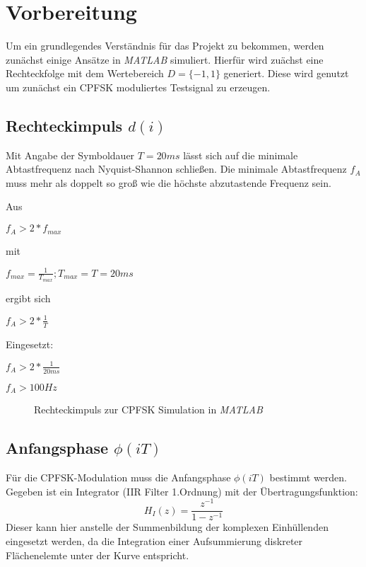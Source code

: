 \documentclass{article}
\begin{document}
\section{Vorbereitung}
Um ein grundlegendes Verständnis für das Projekt zu bekommen, werden zunächst einige Ansätze in \textit{MATLAB} simuliert.
Hierfür wird zuächst eine Rechteckfolge mit dem Wertebereich $D = \{-1,1\}$ generiert. Diese wird genutzt um zunächst ein 
\ac{CPFSK} moduliertes Testsignal zu erzeugen.

\subsection{Rechteckimpuls $d(i)$}\label{sec:rechteck}
Mit Angabe der Symboldauer $T = 20ms$ lässt sich auf die minimale Abtastfrequenz nach Nyquist-Shannon schließen.
Die minimale Abtastfrequenz $f_A$ muss mehr als doppelt so groß wie die höchste abzutastende Frequenz sein.

Aus
\begin{center}
 $
f_A > 2*f_{max}
$
\end{center}

mit 
\begin{center} $f_{max} = \frac{1}{T_{max}} ; T_{max} = T = 20ms$  \end{center}

ergibt sich

\begin{center}
$
f_A > 2*\frac{1}{T}
$
\end{center}

Eingesetzt:
\begin{center}
$f_A > 2*\frac{1}{20ms}$
\end{center}
\begin{center}
$f_A > 100Hz$   
\end{center}
\begin{figure}[!h]
    \centering
    \def\svgscale{0.3}
    \def\svgwidth{\columnwidth}
    \caption{Rechteckimpuls zur \ac{CPFSK} Simulation in \textit{MATLAB}}
\end{figure}

\subsection{Anfangsphase $\phi(iT)$}
Für die \ac{CPFSK}-Modulation muss die Anfangsphase $\phi(iT)$ bestimmt werden.
Gegeben ist ein Integrator (IIR Filter 1.Ordnung) mit der Übertragungsfunktion:
$$
H_I(z)=\frac{z^{-1}}{1-z^{-1}}
$$
Dieser kann hier anstelle der Summenbildung der komplexen Einhüllenden eingesetzt werden, 
da die Integration einer Aufsummierung diskreter Flächenelemte unter der Kurve entspricht.
\end{document}
